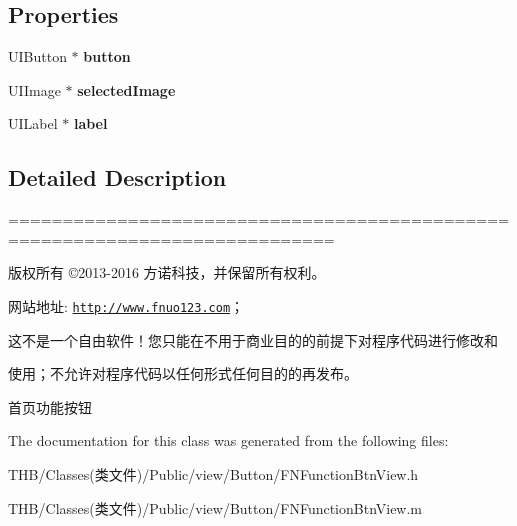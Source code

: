 \subsection*{Properties}
\begin{DoxyCompactItemize}
\item 
\mbox{\label{interface_f_n_function_btn_view_aac8886970b935b757eb675ead7edfd60}} 
U\+I\+Button $\ast$ {\bfseries button}
\item 
\mbox{\label{interface_f_n_function_btn_view_acf57dd0998564a7e5533737970e4990a}} 
U\+I\+Image $\ast$ {\bfseries selected\+Image}
\item 
\mbox{\label{interface_f_n_function_btn_view_a125584822e0527c1837fd1e1f4d46717}} 
U\+I\+Label $\ast$ {\bfseries label}
\end{DoxyCompactItemize}


\subsection{Detailed Description}
============================================================================

版权所有 ©2013-\/2016 方诺科技，并保留所有权利。

网站地址\+: \href{http://www.fnuo123.com}{\tt http\+://www.\+fnuo123.\+com}； 



这不是一个自由软件！您只能在不用于商业目的的前提下对程序代码进行修改和

使用；不允许对程序代码以任何形式任何目的的再发布。 



首页功能按钮 

The documentation for this class was generated from the following files\+:\begin{DoxyCompactItemize}
\item 
T\+H\+B/\+Classes(类文件)/\+Public/view/\+Button/F\+N\+Function\+Btn\+View.\+h\item 
T\+H\+B/\+Classes(类文件)/\+Public/view/\+Button/F\+N\+Function\+Btn\+View.\+m\end{DoxyCompactItemize}
